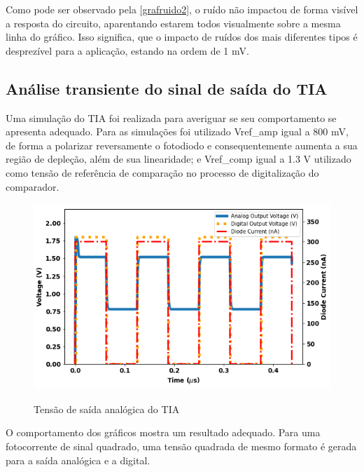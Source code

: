 Como pode ser observado pela \autoref{grafruido2}, o ruído não impactou de forma visível a resposta do circuito, aparentando estarem todos visualmente sobre a mesma linha do gráfico. Isso significa, que o impacto de ruídos dos mais diferentes tipos é desprezível para a aplicação, estando na ordem de 1 mV.

\subsection{Análise transiente do sinal de saída do TIA}

Uma simulação do TIA foi realizada para averiguar se seu comportamento se apresenta adequado. Para as simulações foi utilizado Vref\_amp igual a 800 mV, de forma a polarizar reversamente o fotodiodo e consequentemente aumenta a sua região de depleção, além de sua linearidade; e Vref\_comp igual a 1.3 V utilizado como tensão de referência de comparação no processo de digitalização do comparador.

\begin{figure}[!h]
 \centering
    \caption{Tensão de saída analógica do TIA} 
    \includegraphics[scale=0.7]{Resultados/Graficos/tb_clock.png}
    \label{graf_tiasinal}
\end{figure}

O comportamento dos gráficos mostra um resultado adequado. Para uma fotocorrente de sinal quadrado, uma tensão quadrada de mesmo formato é gerada para a saída analógica e a digital.

